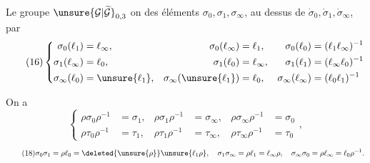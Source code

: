  Le groupe $\unsure{\mathcal G|\widetilde{\mathcal G}}_{0,3}$ on  des éléments
$\sigma_0,\sigma_1,\sigma_\infty$, au dessus de $\dot\sigma_0,\dot\sigma_1,\dot\sigma_\infty$, par
\[
\tag{16}
\left\{\begin{aligned}
\sigma_0(\ell_1)&=\ell_\infty,& \sigma_0(\ell_\infty)&=\ell_1,& \sigma_0(\ell_0)&=(\ell_1\ell_\infty)^{-1}\\
\sigma_1(\ell_\infty)&=\ell_0,& \sigma_1(\ell_0)&=\ell_\infty,& \sigma_1(\ell_1)&=(\ell_\infty\ell_0)^{-1}\\
\sigma_\infty(\ell_0)&=\unsure{\ell_1},& \sigma_\infty(\unsure{\ell_1})&=\ell_0,& \sigma_\infty(\ell_\infty)&=(\ell_0\ell_1)^{-1}
\end{aligned}\right.
\]

On a
\[
\tag{17}
\left\{\begin{aligned}
\rho\sigma_0\rho^{-1}&=\sigma_1,& \rho\sigma_1\rho^{-1}&=\sigma_\infty,& \rho\sigma_\infty\rho^{-1}&=\sigma_0\\
\rho\tau_0\rho^{-1}&=\tau_1,& \rho\tau_1\rho^{-1}&=\tau_\infty,& \rho\tau_\infty\rho^{-1}&=\tau_0
\end{aligned}\right.,
\]
\[
\tag{18}
\sigma_0\sigma_1=\rho\ell_0=\deleted{\unsure{\rho}}\unsure{\ell_1\rho},\quad
\sigma_1\sigma_\infty=\rho\ell_1=\ell_\infty\rho,\quad
\sigma_\infty\sigma_0=\rho\ell_\infty=\ell_0\rho^{-1}.
\]


